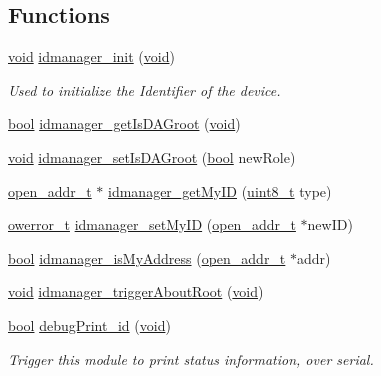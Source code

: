 \subsection*{Functions}
\begin{DoxyCompactItemize}
\item 
\hyperlink{usb__devapi_8h_afabf60e7f57651d6d595a02c75f07cd0}{void} \hyperlink{group___i_d_manager_ga3e974443ae75269d00c3de03992a1669}{idmanager\+\_\+init} (\hyperlink{usb__devapi_8h_afabf60e7f57651d6d595a02c75f07cd0}{void})
\begin{DoxyCompactList}\small\item\em Used to initialize the Identifier of the device. \end{DoxyCompactList}\item 
\hyperlink{_p_e___types_8h_a97a80ca1602ebf2303258971a2c938e2}{bool} \hyperlink{group___i_d_manager_gaa792e6561333f1615bbc61392e826d39}{idmanager\+\_\+get\+Is\+D\+A\+Groot} (\hyperlink{usb__devapi_8h_afabf60e7f57651d6d595a02c75f07cd0}{void})
\item 
\hyperlink{usb__devapi_8h_afabf60e7f57651d6d595a02c75f07cd0}{void} \hyperlink{group___i_d_manager_gab463c5b7e0b714691efe0c46629705f7}{idmanager\+\_\+set\+Is\+D\+A\+Groot} (\hyperlink{_p_e___types_8h_a97a80ca1602ebf2303258971a2c938e2}{bool} new\+Role)
\item 
\hyperlink{structopen__addr__t}{open\+\_\+addr\+\_\+t} $\ast$ \hyperlink{group___i_d_manager_gac95b57a051d12bff7b5c3e3599ce4aa5}{idmanager\+\_\+get\+My\+ID} (\hyperlink{_p_e___types_8h_aba7bc1797add20fe3efdf37ced1182c5}{uint8\+\_\+t} type)
\item 
\hyperlink{opendefs_8h_af20b7c3ed9d2ba19e56a309ad9314803}{owerror\+\_\+t} \hyperlink{group___i_d_manager_ga5e2f6326c043a60f46e019aa538ca7d2}{idmanager\+\_\+set\+My\+ID} (\hyperlink{structopen__addr__t}{open\+\_\+addr\+\_\+t} $\ast$new\+ID)
\item 
\hyperlink{_p_e___types_8h_a97a80ca1602ebf2303258971a2c938e2}{bool} \hyperlink{group___i_d_manager_ga4cff67772250923086a3d6476eb673c8}{idmanager\+\_\+is\+My\+Address} (\hyperlink{structopen__addr__t}{open\+\_\+addr\+\_\+t} $\ast$addr)
\item 
\hyperlink{usb__devapi_8h_afabf60e7f57651d6d595a02c75f07cd0}{void} \hyperlink{group___i_d_manager_ga464f5751bc371a97b41407697e6817a3}{idmanager\+\_\+trigger\+About\+Root} (\hyperlink{usb__devapi_8h_afabf60e7f57651d6d595a02c75f07cd0}{void})
\item 
\hyperlink{_p_e___types_8h_a97a80ca1602ebf2303258971a2c938e2}{bool} \hyperlink{group___i_d_manager_gaa69fa284f9b777d2f5f600f94c3eb44b}{debug\+Print\+\_\+id} (\hyperlink{usb__devapi_8h_afabf60e7f57651d6d595a02c75f07cd0}{void})
\begin{DoxyCompactList}\small\item\em Trigger this module to print status information, over serial. \end{DoxyCompactList}\end{DoxyCompactItemize}


